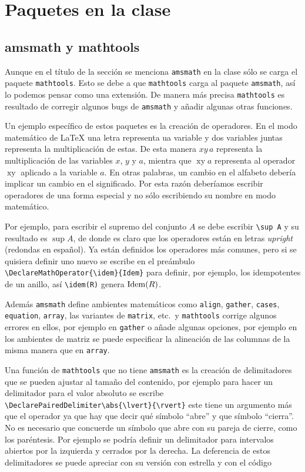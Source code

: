 
\chapter{Paquetes en la clase}

\section{amsmath y mathtools}
Aunque en el título de la sección se menciona \texttt{amsmath} en la clase
sólo se carga el paquete \texttt{mathtools}. Esto se debe a que
\texttt{mathtools} carga al paquete \texttt{amsmath}, así lo podemos pensar
como una extensión. De manera más precisa \texttt{mathtools} es resultado de
corregir algunos bugs de \texttt{amsmath} y añadir algunas otras funciones.

Un ejemplo específico de estos paquetes es la creación de operadores. En el
modo matemático de \LaTeX{} una letra representa ua variable y dos variables
juntas representa la multiplicación de estas. De esta manera \(xy\,a\)
representa la multiplicación de las variables \(x\), \(y\) y \(a\), mientra
que \(\operatorname{xy}a\) representa al operador \(\operatorname{xy}\)
aplicado a la variable \(a\). En otras palabras, un cambio en el alfabeto
debería implicar un cambio en el significado. Por esta razón deberíamos
escribir operadores de una forma especial y no sólo escribiendo su nombre en
modo matemático.

Por ejemplo, para escribir el supremo del conjunto \(A\) se debe escribir
\verb|\sup A| y su resultado es \(\sup A\), de donde es claro que los
operadores están en letras \textit{upright} (redondas en español). Ya están
definidos los operadores más comunes, pero si se quisiera definir uno nuevo
se escribe en el preámbulo \verb|\DeclareMathOperator{\idem}{Idem}| para
definir, por ejemplo, los idempotentes de un anillo, así \verb|\idem(R)|
genera \(\idem(R)\).

Además \texttt{amsmath} define ambientes matemáticos como
\texttt{align}, \texttt{gather}, \texttt{cases}, \texttt{equation},
\texttt{array}, las variantes de \texttt{matrix}, etc.\ y \texttt{mathtools}
corrige algunos errores en ellos, por ejemplo en \texttt{gather} o añade
algunas opciones, por ejemplo en los ambientes de matriz se puede
especificar la alineación de las columnas de la misma manera que en
\texttt{array}.

Una función de \texttt{mathtools} que no tiene \texttt{amsmath} es la creación
de delimitadores que se pueden ajustar al tamaño del contenido, por ejemplo para
hacer un delimitador para el valor absoluto se escribe
\verb|\DeclarePairedDelimiter\abs{\lvert}{\rvert}| este tiene un argumento más
que el operador ya que hay que decir qué símbolo \enquote{abre} y que símbolo
\enquote{cierra}. No es necesario que concuerde un símbolo que abre con su
pareja de cierre, como los paréntesis. Por ejemplo se podría definir un
delimitador para intervalos abiertos por la izquierda y cerrados por la derecha.
La deferencia de estos delimitadores se puede apreciar con su versión con
estrella y con el código

